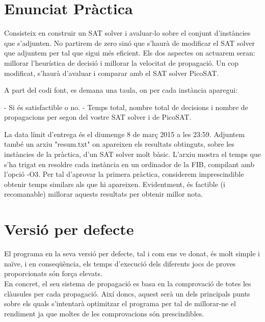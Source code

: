 


\maketitle
\thispagestyle{empty}
\newpage



\section{Enunciat Pràctica}
\color{darkblue}
Consisteix en construir un SAT solver i avaluar-lo sobre el conjunt d'instàncies que s'adjunten. 
No partirem de zero sinó que s'haurà de modificar el SAT solver que adjuntem per tal que sigui més eficient.
Els dos aspectes on actuarem seran: millorar l'heurística de decisió i millorar la velocitat de propagació.
Un cop modificat, s'haurà d'avaluar i comparar amb el SAT solver PicoSAT.

A part del codi font, es demana una taula, on per cada instància aparegui:

- Si és satisfactible o no.
- Temps total, nombre total de decisions i nombre de propagacions per segon del vostre SAT solver i de PicoSAT.


La data límit d'entrega és el diumenge 8 de març 2015 a les 23:59. Adjuntem també un arxiu "resum.txt" on apareixen els resultats obtinguts, sobre les instàncies de la pràctica, d'un SAT solver molt bàsic. L'arxiu mostra el temps que s'ha trigat en resoldre cada instància en un ordinador de la FIB, compilant amb l'opció -O3. Per tal d'aprovar la primera pràctica, considerem imprescindible obtenir temps similars als que hi apareixen. Evidentment, és factible (i recomanable) millorar aquests resultats per obtenir millor nota. 

\color{black}
\section{Versió per defecte}
El programa en la seva versió per defecte, tal i com ens ve donat, és molt simple i naïve, i en conseqüència, els temps d'execució dels diferents jocs de proves proporcionats són força elevats.\\

En concret, el seu sistema de propagació es basa en la comprovació de totes les clàusules per cada propagació. Així doncs, aquest serà un dels principals punts sobre els quals s'intentarà optimitzar el programa per tal de millorar-ne el rendiment ja que moltes de les comprovacions són prescindibles.\\

